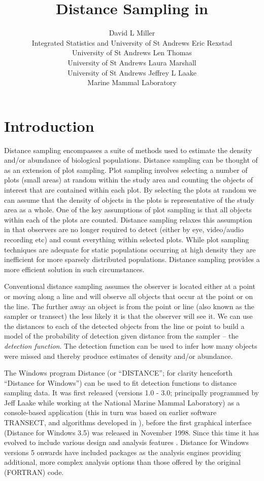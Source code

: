 \documentclass[article]{jss}
\author{
David L Miller\\Integrated Statistics and University of St Andrews \AND Eric Rexstad\\University of St Andrews \And Len Thomas\\University of St Andrews \AND Laura Marshall\\University of St Andrews \And Jeffrey L Laake\\Marine Mammal Laboratory
}
\title{Distance Sampling in \proglang{R}}
\begin{document}
\section{Introduction}\label{introduction}

Distance sampling
\citep{Buckland:2001vm, Buckland:2004ts, buckland2015distance}
encompasses a suite of methods used to estimate the density and/or
abundance of biological populations. Distance sampling can be thought of
as an extension of plot sampling. Plot sampling involves selecting a
number of plots (small areas) at random within the study area and
counting the objects of interest that are contained within each plot. By
selecting the plots at random we can assume that the density of objects
in the plots is representative of the study area as a whole. One of the
key assumptions of plot sampling is that all objects within each of the
plots are counted. Distance sampling relaxes this assumption in that
observers are no longer required to detect (either by eye, video/audio
recording etc) and count everything within selected plots. While plot
sampling techniques are adequate for static populations occurring at
high density they are inefficient for more sparsely distributed
populations. Distance sampling provides a more efficient solution in
such circumstances.

Conventional distance sampling assumes the observer is located either at
a point or moving along a line and will observe all objects that occur
at the point or on the line. The further away an object is from the
point or line (also known as the sampler or transect) the less likely it
is that the observer will see it. We can use the distances to each of
the detected objects from the line or point to build a model of the
probability of detection given distance from the sampler -- the
\emph{detection function}. The detection function can be used to infer
how many objects were missed and thereby produce estimates of density
and/or abundance.

The Windows program Distance (or ``DISTANCE''; for clarity henceforth
``Distance for Windows'') can be used to fit detection functions to
distance sampling data. It was first released (versions 1.0 - 3.0;
principally programmed by Jeff Laake while working at the National
Marine Mammal Laboratory) as a console-based application (this in turn
was based on earlier software TRANSECT, \citet{Burnham:1980wz} and
algorithms developed in \citet{Buckland:1992fa}), before the first
graphical interface (Distance for Windows 3.5) was released in November
1998. Since this time it has evolved to include various design and
analysis features \citep{Thomas:2010cf}. Distance for Windows versions 5
onwards have included  \citep{rcore} packages as the
analysis engines providing additional, more complex analysis options
than those offered by the original (FORTRAN) code.
\end{document}
